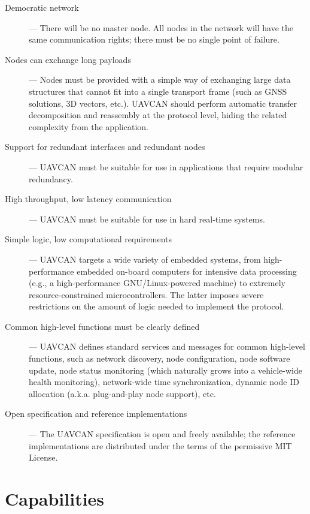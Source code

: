 \begin{description}
    \item[Democratic network] --- There will be no master node.
    All nodes in the network will have the same communication rights; there must be no single point of failure.

    \item[Nodes can exchange long payloads] --- Nodes must be provided with a simple way of exchanging large
    data structures that cannot fit into a single transport frame (such as GNSS solutions, 3D vectors, etc.).
    UAVCAN should perform automatic transfer decomposition and reassembly at the protocol level,
    hiding the related complexity from the application.

    \item[Support for redundant interfaces and redundant nodes] --- UAVCAN must be suitable for use in
    applications that require modular redundancy.

    \item[High throughput, low latency communication] --- UAVCAN must be suitable for use in
    hard real-time systems.

    \item[Simple logic, low computational requirements] --- UAVCAN targets a wide variety of embedded systems,
    from high-performance embedded on-board computers for intensive data processing
    (e.g., a high-performance GNU/Linux-powered machine) to extremely resource-constrained microcontrollers.
    The latter imposes severe restrictions on the amount of logic needed to implement the protocol.

    \item[Common high-level functions must be clearly defined] --- UAVCAN defines standard services
    and messages for common high-level functions, such as network discovery, node configuration,
    node software update, node status monitoring (which naturally grows into a vehicle-wide health monitoring),
    network-wide time synchronization, dynamic node ID allocation (a.k.a. plug-and-play node support), etc.

    \item[Open specification and reference implementations] --- The UAVCAN specification is open and
    freely available; the reference implementations are distributed under the terms of the permissive MIT License.
\end{description}

\section{Capabilities}

